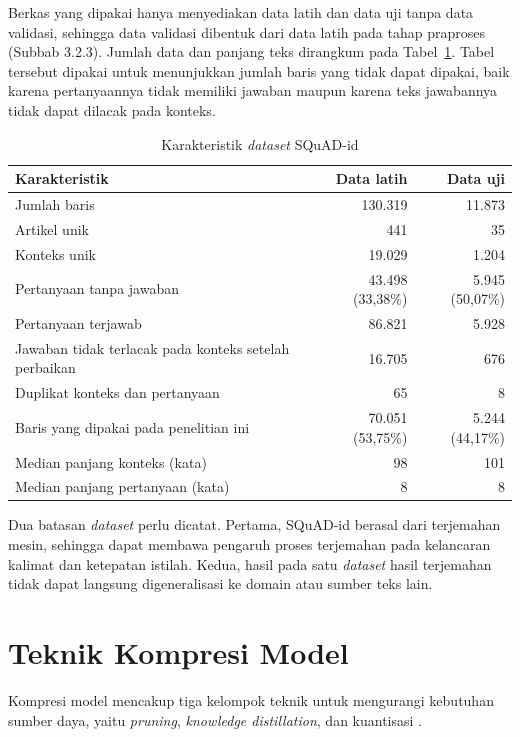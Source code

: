 Berkas yang dipakai hanya menyediakan data latih dan data uji tanpa data validasi, sehingga data validasi dibentuk dari data latih pada tahap praproses (Subbab 3.2.3). Jumlah data dan panjang teks dirangkum pada Tabel~\ref{tab:karakteristik-dataset}. Tabel tersebut dipakai untuk menunjukkan jumlah baris yang tidak dapat dipakai, baik karena pertanyaannya tidak memiliki jawaban maupun karena teks jawabannya tidak dapat dilacak pada konteks.

\begin{table}[htbp]
  \centering
  \small
  \renewcommand{\arraystretch}{1.2}
  \caption{Karakteristik \textit{dataset} SQuAD-id}
  \label{tab:karakteristik-dataset}
  \begin{tabularx}{\textwidth}{@{}Xrr@{}}
    \hline
    \textbf{Karakteristik} & \textbf{Data latih} & \textbf{Data uji} \\
    \hline
    Jumlah baris & 130.319 & 11.873 \\
    Artikel unik & 441 & 35 \\
    Konteks unik & 19.029 & 1.204 \\
    Pertanyaan tanpa jawaban & 43.498 (33,38\%) & 5.945 (50,07\%) \\
    Pertanyaan terjawab & 86.821 & 5.928 \\
    Jawaban tidak terlacak pada konteks setelah perbaikan & 16.705 & 676 \\
    Duplikat konteks dan pertanyaan & 65 & 8 \\
    Baris yang dipakai pada penelitian ini & 70.051 (53,75\%) & 5.244 (44,17\%) \\
    Median panjang konteks (kata) & 98 & 101 \\
    Median panjang pertanyaan (kata) & 8 & 8 \\
    \hline
  \end{tabularx}
\end{table}

Dua batasan \textit{dataset} perlu dicatat. Pertama, SQuAD-id berasal dari terjemahan mesin, sehingga dapat membawa pengaruh proses terjemahan pada kelancaran kalimat dan ketepatan istilah. Kedua, hasil pada satu \textit{dataset} hasil terjemahan tidak dapat langsung digeneralisasi ke domain atau sumber teks lain.

\section{Teknik Kompresi Model}

Kompresi model mencakup tiga kelompok teknik untuk mengurangi kebutuhan sumber daya, yaitu \textit{pruning}, \textit{knowledge distillation}, dan kuantisasi \parencite{gholami2021survey, han2016deep, hinton2015distilling}.

